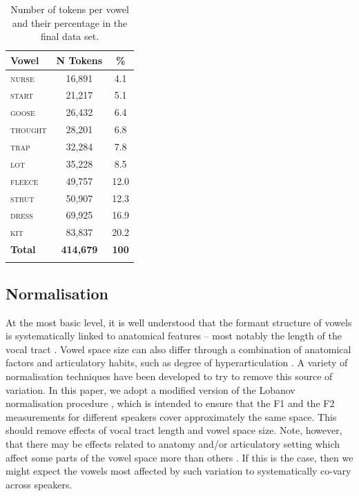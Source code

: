 \documentclass[review]{elsarticle} %
\begin{document}
\begin{table}[t]
\caption{Number of tokens per vowel and their percentage in the final data set.}
\centering
\begin{tabular}{lcc}
\\
  \hline
  Vowel & N Tokens & \% \\ 
  \hline
  \textsc{nurse} & 16,891 & 4.1 \\ 
  \textsc{start} & 21,217 & 5.1 \\ 
  \textsc{goose} & 26,432 & 6.4 \\ 
  \textsc{thought} & 28,201 & 6.8 \\ 
  \textsc{trap} & 32,284 & 7.8 \\ 
  \textsc{lot} & 35,228 & 8.5 \\ 
  \textsc{fleece} & 49,757 & 12.0 \\ 
  \textsc{strut} & 50,907 & 12.3 \\ 
  \textsc{dress} & 69,925 & 16.9 \\ 
  \textsc{kit} & 83,837 & 20.2 \\ 
  \hline
  \textbf{Total} & \textbf{414,679} & \textbf{100} \\ 
  \hline
  
\label{tab:token_counts}
\end{tabular}
\end{table}

\subsection{Normalisation}
\label{sec:normalisation}

At the most basic level, it is well understood that the formant structure of vowels is systematically linked to anatomical features -- most notably the length of the vocal tract \citep{fant1970acoustic, stevens2000acoustic}. Vowel space size can also differ through a combination of anatomical factors and articulatory habits, such as degree of hyperarticulation \citep{lindblom1990explaining}.   A variety of normalisation techniques have been developed to try to remove this source of variation. In this paper, we adopt a modified version of the Lobanov normalisation procedure \citep{lobanov1971classification}, which is intended to ensure that the F1 and the F2 measurements for different speakers cover approximately the same space.  This should remove effects of vocal tract length and vowel space size. Note, however, that there may be effects related to anatomy \citep{johnson2018} and/or articulatory setting \citep{honikman1964articulatory} which affect some parts of the vowel space more than others \citep{johnson2018}.   If this is the case, then we might expect the vowels most affected by such variation to systematically co-vary across speakers. 
\end{document}
